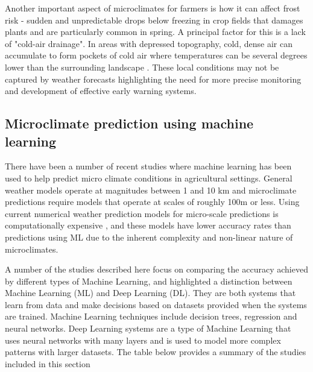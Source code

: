 Another important aspect of microclimates for farmers is how it can affect frost
risk - sudden and unpredictable drops below freezing in crop fields that damages
plants and are particularly common in spring. A principal factor for this is a
lack of "cold-air drainage". In areas with depressed topography, cold, dense air
can accumulate to form pockets of cold air where temperatures can be several
degrees lower than the surrounding landscape \cite{drepper2022}. These local
conditions may not be captured by weather forecasts highlighting the need for
more precise monitoring and development of effective early warning systems.

\subsection{Microclimate prediction using machine learning}

There have been a number of recent studies where machine learning has been used
to help predict micro climate conditions in agricultural settings. General
weather models operate at magnitudes between 1 and 10 km and microclimate
predictions require models that operate at scales of roughly 100m or less. Using
current numerical weather prediction models for micro-scale predictions is
computationally expensive \cite{blunn2024machine}, and these models have lower
accuracy rates than predictions using ML due to the inherent complexity and
non-linear nature of microclimates.

A number of the studies described here focus on comparing the accuracy achieved
by different types of Machine Learning, and highlighted a distinction between
Machine Learning (ML) and Deep Learning (DL).  They are both systems that learn
from data and make decisions based on datasets provided when the systems are
trained.  Machine Learning techniques include decision trees, regression and
neural networks.  Deep Learning systems are a type of Machine Learning that uses
neural networks with many layers and is used to model more complex patterns with
larger datasets. The table below provides a summary of the studies included in
this section


